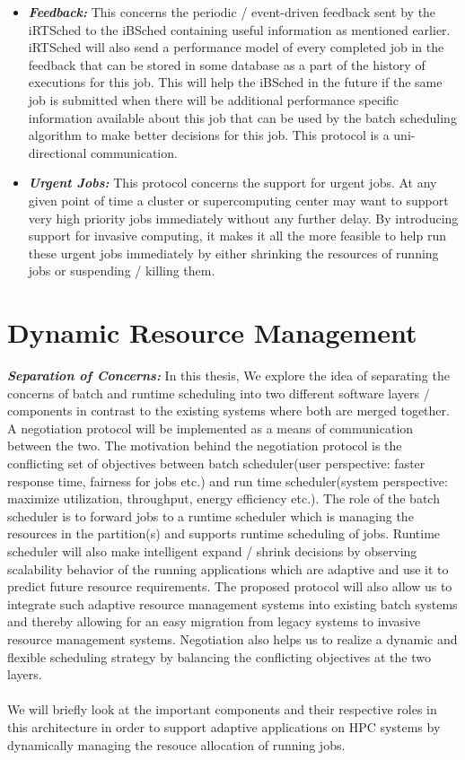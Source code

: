 \begin{itemize}
\item \textbf{\textit{Feedback:}} This concerns the periodic / event-driven feedback sent by the iRTSched to the iBSched containing useful information as mentioned earlier. iRTSched will also send a performance model of every completed job in the feedback that can be stored in some database as a part of the history of executions for this job. This will help the iBSched in the future if the same job is submitted when there will be additional performance specific information available about this job that can be used by the batch scheduling algorithm to make better decisions for this job. This protocol is a uni-directional communication.
\item \textbf{\textit{Urgent Jobs:}} This protocol concerns the support for urgent jobs. At any given point of time a cluster or supercomputing center may want to support very high priority jobs immediately without any further delay. By introducing support for invasive computing, it makes it all the more feasible to help run these urgent jobs immediately by either shrinking the resources of running jobs or suspending / killing them.
\end{itemize}
\section{Dynamic Resource Management}
\textbf{\textit{Separation of Concerns: }}In this thesis, We explore the idea of separating the concerns of batch and runtime scheduling into
two different software layers / components in contrast to the existing systems where both are merged together. A negotiation protocol will be implemented as a means of communication between the two. The motivation behind the negotiation protocol is the conflicting set of objectives between batch scheduler(user perspective: faster response time, fairness for jobs etc.) and run time scheduler(system perspective: maximize utilization, throughput, energy efficiency etc.). The role of the batch scheduler is to forward jobs to a runtime scheduler which is managing the resources in the partition(s) and supports runtime scheduling of jobs. Runtime scheduler will also make intelligent expand / shrink decisions by observing scalability behavior of the running applications which are adaptive and use it to predict future resource requirements. The proposed protocol will also allow us to integrate such adaptive resource management systems into existing batch systems and thereby allowing for an easy migration from legacy systems to invasive resource management systems. Negotiation also helps us to realize a dynamic and flexible scheduling strategy by balancing the conflicting objectives at the two layers.\\ \\
We will briefly look at the important components and their respective roles in this architecture in order to support adaptive applications on HPC systems by dynamically managing the resouce allocation of running jobs. 
